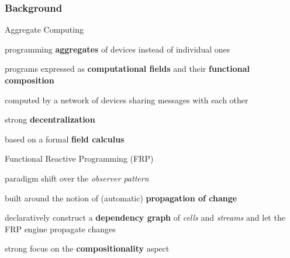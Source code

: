 \begin{frame}
    \frametitle{Background}
    \begin{blockitems}{Aggregate Computing}
        \item programming \textbf{aggregates} of devices instead of individual ones
        \item programs expressed as \textbf{computational fields} and their \textbf{functional composition}
        \item computed by a network of devices sharing messages with each other
        \item strong \textbf{decentralization}
        \item based on a formal \textbf{field calculus}
    \end{blockitems}
    \begin{blockitems}{Functional Reactive Programming (FRP)}
        \item paradigm shift over the \textit{observer pattern}
        \item built around the notion of (automatic) \textbf{propagation of change}
        \item declaratively construct a \textbf{dependency graph} of \textit{cells} and \textit{streams} and let the FRP engine propagate changes
        \item strong focus on the \textbf{compositionality} aspect
    \end{blockitems}
\end{frame}

